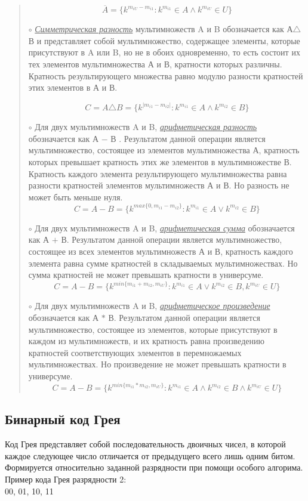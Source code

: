 \documentclass[10pt,a4paper,final]{article} %
\begin{document}
\begin{quote}
$$\overline{A}=\{k^{m_{iU}-m_{i1}}:k^{m_{i1}} \in A \land k^{m_{iU}} \in U\}$$


$\circ$ \textit{\underline{Симметрическая разность}} мультимножеств A и B обозначается как А$\triangle$В и представляет собой мультимножество, содержащее элементы, которые присутствуют в A или B, но не в обоих одновременно, то есть состоит их тех элементов мультимножества А и В, кратности которых различны. Кратность результирующего множества равно модулю разности кратностей этих элементов в А и В.

$$ C=A \triangle B= \{k^{\left| m_{i1} - m_{i2}\right|}:k^{m_{i1}} \in A \land k^{m_{i2}} \in B \}$$


$\circ$ Для двух мультимножеств A и B, \underline{\textit{арифметическая разность}} обозначается как  А $-$ В . Результатом данной операции является мультимножество, состоящее из элементов мультимножества А, кратность которых превышает кратность этих же элементов в мультимножестве В. Кратность каждого элемента результирующего мультимножества равна разности кратностей элементов мультимножеств А и В. Но разность не может быть меньше нуля.
$$ C= A-B=\{k^{max\{0,m_{i1}-m_{i2}\}}:k^{m_{i1}} \in A \lor k^{m_{i2}} \in B \}$$
 
 
$\circ$ Для двух мультимножеств A и B, \underline{\textit{арифметическая сумма}} обозначается как  А $+$ В. Результатом данной операции является мультимножество, состоящее из всех элементов мультимножеств А и В, кратность каждого элемента равна сумме кратностей в складываемых мультимножествах. Но сумма кратностей не может превышать кратности в универсуме. 
$$ C= A-B=\{k^{min\{m_{i1}+m_{i2},m_{iU}\}}:k^{m_{i1}} \in A \lor k^{m_{i2}} \in B, k^{m_{iU}} \in U \}$$


$\circ$ Для двух мультимножеств A и B, \underline{\textit{арифметическое произведение}} обозначается как  А $*$ В. Результатом данной операции является мультимножество, состоящее из элементов, которые присутствуют в каждом из мультимножеств, и их кратность равна произведению кратностей соответствующих элементов в перемножаемых мультимножествах. Но произведение не может превышать кратности в универсуме.
$$ C= A-B=\{k^{min\{m_{i1}*m_{i2},m_{iU}\}}:k^{m_{i1}} \in A \land k^{m_{i2}} \in B \land k^{m_{iU}} \in U \}$$

\end{quote}
 
\subsection {Бинарный код Грея}
\par Код Грея  представляет собой последовательность двоичных чисел, в которой каждое следующее число отличается от предыдущего всего лишь одним битом. Формируется относительно заданной разрядности при помощи особого алгорима.\\
Пример кода Грея разрядности 2:\\
00, 01, 10, 11
\end{document}
